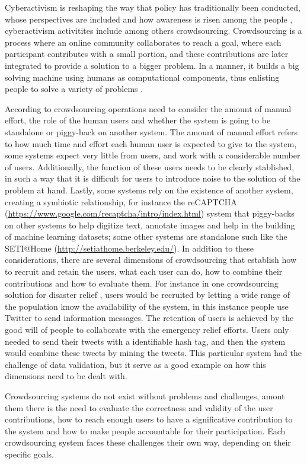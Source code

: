 \documentclass[a4paper,10pt]{article}
\begin{document}
Cyberactivism is reshaping the way that policy has traditionally been conducted, whose perspectives are included and how awareness is risen among the people \citep{milan2013}, cyberactivism activitites include among others crowdsourcing. Crowdsourcing is a process where an online community collaborates to reach a goal, where each participant contributes with a small portion, and these contributions are later integrated to provide a solution to a bigger problem. In a manner, it builds a big solving machine using humans as computational components, thus enlisting people to solve a variety of problems \citep{doan2011}.

According to \cite{doan2011} crowdsourcing operations need to consider the amount of manual effort, the role of the human users and whether the system is going to be standalone or piggy-back on another system. The amount of manual effort refers to how much time and effort each human user is expected to give to the system, some systems expect very little from users, and work with a considerable number of users. Additionally, the function of these users needs to be clearly stablished, in such a way that it is difficult for users to introduce noise to the solution of the problem at hand. Lastly, some systems rely on the existence of another system, creating a symbiotic relationship, for instance the reCAPTCHA (\url{https://www.google.com/recaptcha/intro/index.html}) system that piggy-backs on other systems to help digitize text, annotate images and help in the building of machine learning datasets; some other systems are standalone such like the SETI@Home (\url{http://setiathome.berkeley.edu/}). In addition to these considerations, there are several dimensions of crowdsourcing that establish how to recruit and retain the users, what each user can do, how to combine their contributions and how to evaluate them. For instance in one crowdsourcing solution for disaster relief \cite{gao2011}, users would be recruited by letting a wide range of the population know the availability of the system, in this instance people use Twitter to send information messages. The retention of users is achieved by the good will of people to collaborate with the emergency relief efforts. Users only needed to send their tweets with a identifiable hash tag, and then the system would combine these tweets by mining the tweets. This particular system had the challenge of data validation, but it serve as a good example on how this dimensions need to be dealt with.

Crowdsourcing systems do not exist without problems and challenges, amont them there is the need to evaluate the correctness and validity of the user contributions, how to reach enough users to have a significative contribution to the system and how to make people accountable for their participation. Each crowdsourcing system faces these challenges their own way, depending on their specific goals.
\end{document}
